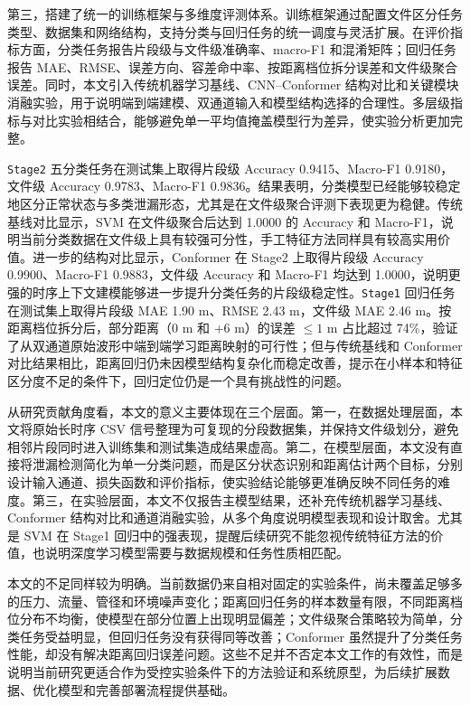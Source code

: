 第三，搭建了统一的训练框架与多维度评测体系。训练框架通过配置文件区分任务类型、数据集和网络结构，支持分类与回归任务的统一调度与灵活扩展。在评价指标方面，分类任务报告片段级与文件级准确率、macro-F1 和混淆矩阵；回归任务报告 MAE、RMSE、误差方向、容差命中率、按距离档位拆分误差和文件级聚合误差。同时，本文引入传统机器学习基线、CNN--Conformer 结构对比和关键模块消融实验，用于说明端到端建模、双通道输入和模型结构选择的合理性。多层级指标与对比实验相结合，能够避免单一平均值掩盖模型行为差异，使实验分析更加完整。

\texttt{Stage2} 五分类任务在测试集上取得片段级 Accuracy 0.9415、Macro-F1 0.9180，文件级 Accuracy 0.9783、Macro-F1 0.9836。结果表明，分类模型已经能够较稳定地区分正常状态与多类泄漏形态，尤其是在文件级聚合评测下表现更为稳健。传统基线对比显示，SVM 在文件级聚合后达到 1.0000 的 Accuracy 和 Macro-F1，说明当前分类数据在文件级上具有较强可分性，手工特征方法同样具有较高实用价值。进一步的结构对比显示，Conformer 在 Stage2 上取得片段级 Accuracy 0.9900、Macro-F1 0.9883，文件级 Accuracy 和 Macro-F1 均达到 1.0000，说明更强的时序上下文建模能够进一步提升分类任务的片段级稳定性。\texttt{Stage1} 回归任务在测试集上取得片段级 MAE 1.90 m、RMSE 2.43 m，文件级 MAE 2.46 m。按距离档位拆分后，部分距离（0 m 和 +6 m）的误差 $\leq 1$ m 占比超过 74\%，验证了从双通道原始波形中端到端学习距离映射的可行性；但与传统基线和 Conformer 对比结果相比，距离回归仍未因模型结构复杂化而稳定改善，提示在小样本和特征区分度不足的条件下，回归定位仍是一个具有挑战性的问题。

从研究贡献角度看，本文的意义主要体现在三个层面。第一，在数据处理层面，本文将原始长时序 CSV 信号整理为可复现的分段数据集，并保持文件级划分，避免相邻片段同时进入训练集和测试集造成结果虚高。第二，在模型层面，本文没有直接将泄漏检测简化为单一分类问题，而是区分状态识别和距离估计两个目标，分别设计输入通道、损失函数和评价指标，使实验结论能够更准确反映不同任务的难度。第三，在实验层面，本文不仅报告主模型结果，还补充传统机器学习基线、Conformer 结构对比和通道消融实验，从多个角度说明模型表现和设计取舍。尤其是 SVM 在 Stage1 回归中的强表现，提醒后续研究不能忽视传统特征方法的价值，也说明深度学习模型需要与数据规模和任务性质相匹配。

本文的不足同样较为明确。当前数据仍来自相对固定的实验条件，尚未覆盖足够多的压力、流量、管径和环境噪声变化；距离回归任务的样本数量有限，不同距离档位分布不均衡，使模型在部分位置上出现明显偏差；文件级聚合策略较为简单，分类任务受益明显，但回归任务没有获得同等改善；Conformer 虽然提升了分类任务性能，却没有解决距离回归误差问题。这些不足并不否定本文工作的有效性，而是说明当前研究更适合作为受控实验条件下的方法验证和系统原型，为后续扩展数据、优化模型和完善部署流程提供基础。

